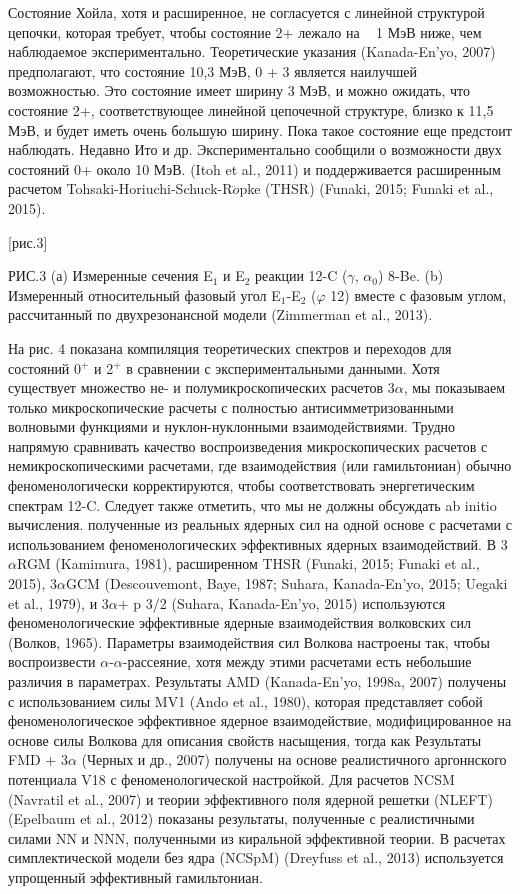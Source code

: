 \documentclass[fontsize=14pt]{scrarticle}
\begin{document}
Состояние Хойла, хотя и расширенное, не согласуется с линейной структурой цепочки, которая требует, чтобы состояние 2+ лежало на ~ 1 МэВ ниже, чем наблюдаемое экспериментально. Теоретические указания (Kanada-En'yo, 2007) предполагают, что состояние 10,3 МэВ, 0 + 3 является наилучшей возможностью. Это состояние имеет ширину 3 МэВ, и можно ожидать, что состояние 2+, соответствующее линейной цепочечной структуре, близко к 11,5 МэВ, и будет иметь очень большую ширину. Пока такое состояние еще предстоит наблюдать. Недавно Ито и др. Экспериментально сообщили о возможности двух состояний 0+ около 10 МэВ. (Itoh et al., 2011) и поддерживается расширенным расчетом Tohsaki-Horiuchi-Schuck-R$\ddot{o}$pke (THSR) (Funaki, 2015; Funaki et al., 2015).

[рис.3]

РИС.3  (а) Измеренные сечения E$_{1}$ и E$_{2}$ реакции 12-C ($\gamma$, $\alpha_{0}$) 8-Be. (b) Измеренный относительный фазовый угол E$_{1}$-E$_{2}$ ($\varphi$ 12) вместе с фазовым углом, рассчитанный по двухрезонансной модели (Zimmerman et al., 2013).

На рис. 4 показана компиляция теоретических спектров и переходов для состояний 0$^{+}$ и 2$^{+}$ в сравнении с экспериментальными данными. Хотя существует множество не- и полумикроскопических расчетов 3$\alpha$, мы показываем только микроскопические расчеты с полностью антисимметризованными волновыми функциями и нуклон-нуклонными взаимодействиями. Трудно напрямую сравнивать качество воспроизведения микроскопических расчетов с немикроскопическими расчетами, где взаимодействия (или гамильтониан) обычно феноменологически корректируются, чтобы соответствовать энергетическим спектрам 12-C. Следует также отметить, что мы не должны обсуждать ab initio вычисления. полученные из реальных ядерных сил на одной основе с расчетами с использованием феноменологических эффективных ядерных взаимодействий.  В 3$\alpha$RGM (Kamimura, 1981), расширенном THSR (Funaki, 2015; Funaki et al., 2015), 3$\alpha$GCM (Descouvemont, Baye, 1987; Suhara, Kanada-En'yo, 2015; Uegaki et al., 1979), и 3$\alpha$+ p 3/2 (Suhara, Kanada-En'yo, 2015) используются феноменологические эффективные ядерные взаимодействия волковских сил (Волков, 1965). Параметры взаимодействия сил Волкова настроены так, чтобы воспроизвести $\alpha$-$\alpha$-рассеяние, хотя между этими расчетами есть небольшие различия в параметрах. Результаты AMD (Kanada-En'yo, 1998a, 2007) получены с использованием силы MV1 (Ando et al., 1980), которая представляет собой феноменологическое эффективное ядерное взаимодействие, модифицированное на основе силы Волкова для описания свойств насыщения, тогда как Результаты FMD + 3$\alpha$ (Черных и др., 2007) получены на основе реалистичного аргоннского потенциала V18 с феноменологической настройкой. Для расчетов NCSM (Navratil et al., 2007) и теории эффективного поля ядерной решетки (NLEFT) (Epelbaum et al., 2012) показаны результаты, полученные с реалистичными силами NN и NNN, полученными из киральной эффективной теории. В расчетах симплектической модели без ядра (NCSpM) (Dreyfuss et al., 2013) используется упрощенный эффективный гамильтониан.
\end{document}
